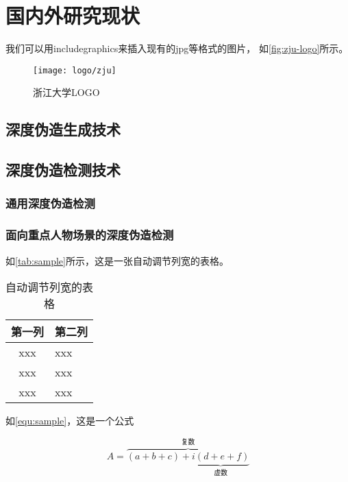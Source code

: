 \section{国内外研究现状}

我们可以用includegraphics来插入现有的jpg等格式的图片，
如\autoref{fig:zju-logo}所示。

\begin{figure}[htbp]
    \centering
    \texttt{[image: logo/zju]}
    \caption{\label{fig:zju-logo}浙江大学LOGO}
\end{figure}


\subsection{深度伪造生成技术}

\subsection{深度伪造检测技术}
\subsubsection{通用深度伪造检测}

\subsubsection{面向重点人物场景的深度伪造检测}

\par 如\autoref{tab:sample}所示，这是一张自动调节列宽的表格。

\begin{table}[htbp]
    \caption{\label{tab:sample}自动调节列宽的表格}
    \begin{tabularx}{\linewidth}{c|X<{\centering}}
        \hline
        第一列 & 第二列 \\ \hline
        xxx & xxx \\ \hline
        xxx & xxx \\ \hline
        xxx & xxx \\ \hline
    \end{tabularx}
\end{table}


\par 如\autoref{equ:sample}，这是一个公式

\begin{equation}
    \label{equ:sample}
    A=\overbrace{(a+b+c)+\underbrace{i(d+e+f)}_{\text{虚数}}}^{\text{复数}}
\end{equation}

